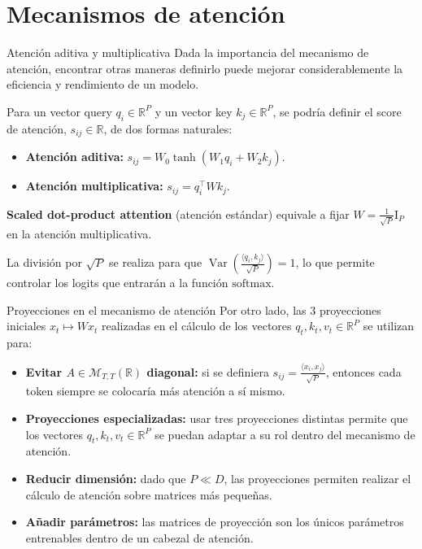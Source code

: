 \documentclass{beamer}
\newcommand{\R}{\mathbb{R}}
\begin{document}
\section{Mecanismos de atención}

\begin{frame}{Atención aditiva y multiplicativa}
    Dada la importancia del mecanismo de atención, encontrar otras maneras definirlo puede mejorar considerablemente la eficiencia y rendimiento de un modelo.

    Para un vector query $q_i\in\R^P$ y un vector key $k_j\in\R^P$, se podría definir el score de atención, $s_{ij}\in\R$, de dos formas naturales:
    \begin{itemize}
        \item \textbf{Atención aditiva:} $s_{ij}=W_0\tanh\left(W_1q_i+W_2k_j\right)$.
        \item \textbf{Atención multiplicativa:} $s_{ij}=q_i^\top W k_j$.
    \end{itemize}
    \textbf{Scaled dot-product attention} (atención estándar) equivale a fijar $W=\frac{1}{\sqrt{P}}\text{I}_P$ en la atención multiplicativa.

    La división por $\sqrt{P}$ se realiza para que $\operatorname{Var}\left(\frac{\langle q_i, k_j\rangle}{\sqrt{P}}\right)=1$, lo que permite controlar los logits que entrarán a la función $\text{softmax}$.
\end{frame}

\begin{frame}{Proyecciones en el mecanismo de atención}
    Por otro lado, las 3 proyecciones iniciales $x_t\mapsto Wx_t$ realizadas en el cálculo de los vectores $q_t,k_t,v_t\in\R^P$ se utilizan para:
    \begin{itemize}
        \item \textbf{Evitar $A\in\mathcal{M}_{T,T}(\R)$ diagonal:} si se definiera $s_{ij} = \frac{\langle x_i, x_j\rangle}{\sqrt{P}}$, entonces cada token siempre se colocaría más atención a sí mismo.
        \item \textbf{Proyecciones especializadas:} usar tres proyecciones distintas permite que los vectores $q_t,k_t,v_t\in\R^P$ se puedan adaptar a su rol dentro del mecanismo de atención.
        \item \textbf{Reducir dimensión:} dado que $P\ll D$, las proyecciones permiten realizar el cálculo de atención sobre matrices más pequeñas.
        \item \textbf{Añadir parámetros:} las matrices de proyección son los únicos parámetros entrenables dentro de un cabezal de atención.
    \end{itemize}
\end{frame}
\end{document}
